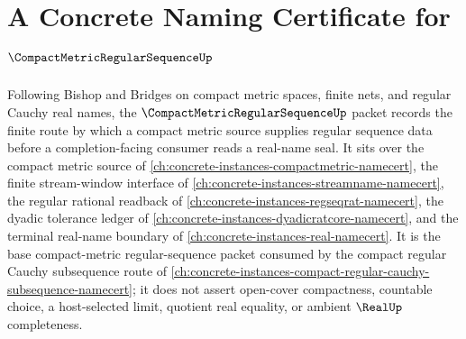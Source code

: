 \chapter{A Concrete Naming Certificate for $\CompactMetricRegularSequenceUp$}
\label{ch:concrete-instances-compact-metric-regular-sequence-namecert}

Following Bishop and Bridges on compact metric spaces, finite nets, and regular Cauchy real names, the $\CompactMetricRegularSequenceUp$ packet records the finite route by which a compact metric source supplies regular sequence data before a completion-facing consumer reads a real-name seal. It sits over the compact metric source of \autoref{ch:concrete-instances-compactmetric-namecert}, the finite stream-window interface of \autoref{ch:concrete-instances-streamname-namecert}, the regular rational readback of \autoref{ch:concrete-instances-regseqrat-namecert}, the dyadic tolerance ledger of \autoref{ch:concrete-instances-dyadicratcore-namecert}, and the terminal real-name boundary of \autoref{ch:concrete-instances-real-namecert}. It is the base compact-metric regular-sequence packet consumed by the compact regular Cauchy subsequence route of \autoref{ch:concrete-instances-compact-regular-cauchy-subsequence-namecert}; it does not assert open-cover compactness, countable choice, a host-selected limit, quotient real equality, or ambient $\RealUp$ completeness.

